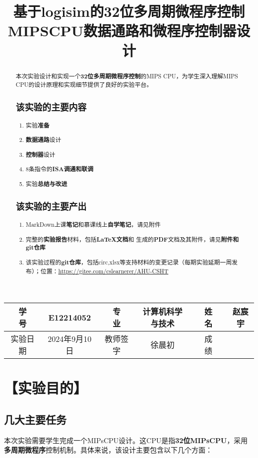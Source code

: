 \documentclass[withoutpreface]{cumcmthesis} %
\title{基于logisim的32位多周期微程序控制MIPSCPU数据通路和微程序控制器设计} %
\begin{document}
\maketitle
\begin{tabular}{cccccc}
\hline
学　　号 & E12214052 &专　　业 & 计算机科学与技术 &姓　　名 & 赵宸宇 \\
\hline
实验日期 & 2024年9月10日 &教师签字 & 徐晨初 &成　　绩&\\
\hline
\end{tabular}
\begin{abstract}
本次实验设计和实现一个\textbf{32位多周期微程序控制}的MIPS CPU，为学生深入理解MIPS CPU的设计原理和实现细节提供了良好的实验平台。

\subsection*{该实验的\textbf{主要内容}}
\begin{enumerate}
    \item 实验\textbf{准备}
    \item \textbf{数据通路}设计
    \item \textbf{控制器}设计
    \item 8条指令的\textbf{ISA调通和联调}
    \item 实验\textbf{总结与改进}
\end{enumerate}

\subsection*{该实验的\textbf{主要产出}}
\begin{enumerate}
    \item MarkDown上课\textbf{笔记}和慕课线上\textbf{自学笔记}，请见附件
    \item 完整的\textbf{实验报告}材料，包括\textbf{\LaTeX{}文档}和 生成的\textbf{PDF}文档及其附件，请见\textbf{附件和git仓库}
    \item 该实验过程的\textbf{git仓库}，包括circ,xlsx等支持材料的变更记录（每期实验延期一周发布）；位置：\url{https://gitee.com/cslearnerer/AHU-CSHT}
\end{enumerate}
\end{abstract}


\tableofcontents


\section{【实验目的】}
\subsection{几大主要任务}
本次实验需要学生完成一个MIPsCPU设计。这CPU是指\textbf{32位MIPsCPU}，采用\textbf{多周期微程序}控制机制。具体来说，该设计主要包含以下几个方面：
\end{document}
